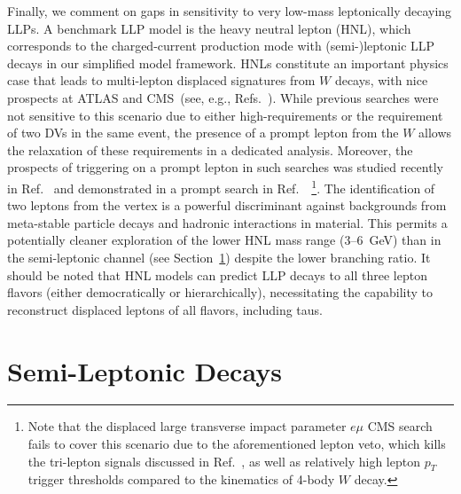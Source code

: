{Finally, we comment on gaps in sensitivity to very low-mass leptonically decaying LLPs. A benchmark LLP model is the heavy neutral lepton (HNL), which corresponds to the charged-current production mode with (semi-)leptonic LLP decays in our simplified model framework. HNLs constitute an important physics case that leads to multi-lepton displaced signatures from $W$ decays, with nice prospects at ATLAS and CMS~(see, e.g., Refs.~\cite{Izaguirre2015,Nemevsek:2018bbt,Cottin:2018kmq}). While previous searches were not sensitive to this scenario due to either high-\pT requirements or the requirement of two DVs in the same event, the presence of a prompt lepton from the $W$ allows the relaxation of these requirements in a dedicated analysis.  Moreover, the prospects of triggering on a prompt lepton in such searches was studied recently in Ref.~\cite{Cottin:2018kmq} and demonstrated in a prompt search in Ref.~\cite{Sirunyan:2018mtv}~\footnote{Note that the displaced large transverse impact parameter $e\mu$ CMS search~\cite{CMS-PAS-EXO-16-022} fails to cover this scenario due to the aforementioned lepton veto, which kills the tri-lepton signals discussed in Ref.~\cite{Izaguirre2015}, as well as relatively high lepton $p_T$ trigger thresholds compared to the kinematics of 4-body $W$ decay.}. The identification of two leptons from the vertex is a powerful discriminant against backgrounds from meta-stable particle decays and hadronic interactions in material. This permits a potentially cleaner exploration of the lower HNL mass range (3--6~GeV) than in the semi-leptonic channel (see Section~\ref{subsec:dsemilep}) despite the lower branching ratio. It should be noted that HNL models can predict LLP decays to all three lepton flavors (either democratically or hierarchically), necessitating the capability to reconstruct displaced leptons of all flavors, including taus.

\section{Semi-Leptonic Decays}
\label{subsec:dsemilep}

}
